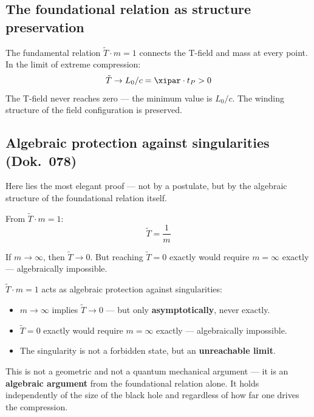 \subsection{The foundational relation as structure preservation}

The fundamental relation $\tilde{T} \cdot m = 1$ connects the T-field and mass at every point. In the limit of extreme compression:
\begin{equation}
  \tilde{T} \rightarrow L_0/c = \xipar \cdot t_P > 0
\end{equation}
The T-field never reaches zero --- the minimum value is $L_0/c$. The winding structure of the field configuration is preserved.

\subsection{Algebraic protection against singularities (Dok.~078)}

Here lies the most elegant proof --- not by a postulate, but by the algebraic structure of the foundational relation itself.

From $\tilde{T} \cdot m = 1$:
\begin{equation}
  \tilde{T} = \frac{1}{m}
\end{equation}

If $m \rightarrow \infty$, then $\tilde{T} \rightarrow 0$. But reaching $\tilde{T} = 0$ exactly would require $m = \infty$ exactly --- algebraically impossible.

\begin{keyresult}
$\tilde{T} \cdot m = 1$ acts as algebraic protection against singularities:
\begin{itemize}
  \item $m \rightarrow \infty$ implies $\tilde{T} \rightarrow 0$ --- but only \textbf{asymptotically}, never exactly.
  \item $\tilde{T} = 0$ exactly would require $m = \infty$ exactly --- algebraically impossible.
  \item The singularity is not a forbidden state, but an \textbf{unreachable limit}.
\end{itemize}
This is not a geometric and not a quantum mechanical argument --- it is an \textbf{algebraic argument} from the foundational relation alone. It holds independently of the size of the black hole and regardless of how far one drives the compression.
\end{keyresult}

